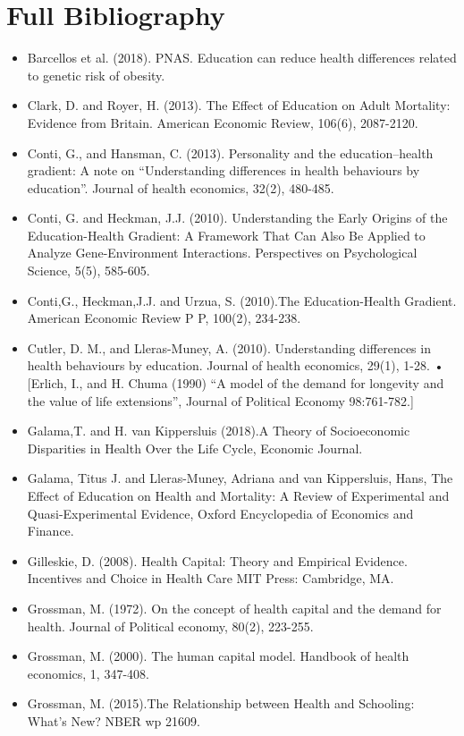 \section{Full Bibliography}
\begin{itemize}
\item Barcellos et al. (2018). PNAS. Education can reduce health differences related to genetic risk of obesity.
\item Clark, D. and Royer, H. (2013). The Effect of Education on Adult Mortality: Evidence from Britain. American Economic Review, 106(6),
2087-2120.
\item Conti, G., and Hansman, C. (2013). Personality and the education–health gradient: A note on “Understanding differences in health
behaviours by education”. Journal of health economics, 32(2), 480-485.
\item Conti, G. and Heckman, J.J. (2010). Understanding the Early Origins of the Education-Health Gradient: A Framework That Can Also Be Applied to Analyze Gene-Environment Interactions. Perspectives on Psychological Science, 5(5), 585-605.
\item Conti,G., Heckman,J.J. and Urzua, S. (2010).The Education-Health Gradient. American Economic Review P P, 100(2), 234-238.
\item Cutler, D. M., and Lleras-Muney, A. (2010). Understanding differences in health behaviours by education. Journal of health economics,
29(1), 1-28.
• [Erlich, I., and H. Chuma (1990) “A model of the demand for longevity and the value of life extensions”, Journal of Political Economy
98:761-782.]
\item Galama,T. and H. van Kippersluis (2018).A Theory of Socioeconomic Disparities in Health Over the Life Cycle, Economic Journal.
\item Galama, Titus J. and Lleras-Muney, Adriana and van Kippersluis, Hans, The Effect of Education on Health and Mortality: A Review of
Experimental and Quasi-Experimental Evidence, Oxford Encyclopedia of Economics and Finance.
\item Gilleskie, D. (2008). Health Capital: Theory and Empirical Evidence. Incentives and Choice in Health Care MIT Press: Cambridge, MA.
\item Grossman, M. (1972). On the concept of health capital and the demand for health. Journal of Political economy, 80(2), 223-255.
\item Grossman, M. (2000). The human capital model. Handbook of health economics, 1, 347-408.
\item Grossman, M. (2015).The Relationship between Health and Schooling: What’s New? NBER wp 21609.

\end{itemize}
